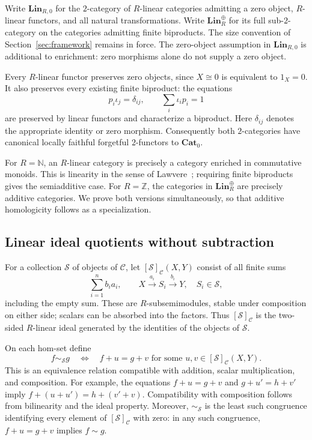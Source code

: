 \documentclass[11pt,reqno,a4paper]{amsart}
\theoremstyle{definition}
\theoremstyle{remark}
\newcommand{\C}{\mathcal{C}}
\newcommand{\0}{\mathbf{0}}
\renewcommand{\1}{\mathbf{1}}
\newcommand{\iso}{\cong}
\newcommand{\Pt}{\mathbf{Cat}_{0}}
\newcommand{\Scl}{\mathcal S}
\begin{document}
Write $\mathbf{Lin}_{R,0}$ for the $2$-category of $R$-linear
categories admitting a zero object, $R$-linear functors, and all
natural transformations. Write $\mathbf{Lin}_{R}^{\oplus}$ for
its full sub-$2$-category on the categories admitting finite
biproducts. The size convention of Section~\ref{sec:framework}
remains in force. The zero-object assumption in
$\mathbf{Lin}_{R,0}$ is additional to enrichment: zero morphisms
alone do not supply a zero object.

Every $R$-linear functor preserves zero objects, since
$X\iso0$ is equivalent to $1_X=0$. It also preserves every
existing finite biproduct: the equations
\[
 p_i\iota_j=\delta_{ij},\qquad
 \sum_i\iota_i p_i=1
\]
are preserved by linear functors and characterize a biproduct.
Here $\delta_{ij}$ denotes the appropriate identity or zero
morphism. Consequently both $2$-categories have canonical
locally faithful forgetful $2$-functors to $\Pt$.

For $R=\mathbb N$, an $R$-linear category is precisely a category
enriched in commutative monoids. This is linearity in the sense
of Lawvere~\cite{LawvereLinear}; requiring finite biproducts gives
the semiadditive case. For $R=\mathbb Z$, the categories in
$\mathbf{Lin}_{R}^{\oplus}$ are precisely additive categories.
We prove both versions simultaneously, so that additive
homologicity follows as a specialization.

\subsection{Linear ideal quotients without subtraction}

For a collection $\Scl$ of objects of $\C$, let
$[\Scl]_{\C}(X,Y)$ consist of all finite sums
\begin{equation}\label{eq:rig-ideal}
 \sum_{i=1}^{n} b_i a_i,
 \qquad
 X\xrightarrow{a_i}S_i\xrightarrow{b_i}Y,
 \quad S_i\in\Scl,
\end{equation}
including the empty sum. These are $R$-subsemimodules, stable
under composition on either side; scalars can be absorbed into
the factors. Thus $[\Scl]_{\C}$ is the two-sided $R$-linear
ideal generated by the identities of the objects of $\Scl$.

On each hom-set define
\begin{equation}\label{eq:rig-congruence}
 f\sim_{\Scl}g
 \quad\Longleftrightarrow\quad
 f+u=g+v
 \text{ for some }u,v\in[\Scl]_{\C}(X,Y).
\end{equation}
This is an equivalence relation compatible with addition,
scalar multiplication, and composition. For example, the
equations $f+u=g+v$ and $g+u'=h+v'$ imply
$f+(u+u')=h+(v'+v)$. Compatibility with composition follows
from bilinearity and the ideal property. Moreover,
$\sim_{\Scl}$ is the least such congruence identifying every
element of $[\Scl]_{\C}$ with zero: in any such congruence,
$f+u=g+v$ implies $f\sim g$.
\end{document}
